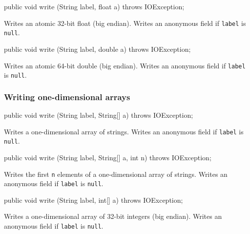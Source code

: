 \begin{code}

   public void write (String label, float a) throws IOException;
\end{code}
\begin{tabb}
Writes an atomic 32-bit float (big endian).
Writes an anonymous field if \texttt{label} is \texttt{null}.
\end{tabb}

\begin{code}

   public void write (String label, double a) throws IOException;
\end{code}
\begin{tabb}
Writes an atomic 64-bit double (big endian).
Writes an anonymous field if \texttt{label} is \texttt{null}.
\end{tabb}


\subsubsection*{Writing one-dimensional arrays}

\begin{code}

   public void write (String label, String[] a) throws IOException;
\end{code}
\begin{tabb}
Writes a one-dimensional array of strings.
Writes an anonymous field if \texttt{label} is \texttt{null}.
\end{tabb}

\begin{code}

   public void write (String label, String[] a, int n) throws IOException;
\end{code}
\begin{tabb}
Writes the first \texttt{n} elements of a one-dimensional array of strings.
Writes an anonymous field if \texttt{label} is \texttt{null}.
\end{tabb}

\begin{code}

   public void write (String label, int[] a) throws IOException;
\end{code}
\begin{tabb}
Writes a one-dimensional array of 32-bit integers (big endian).
Writes an anonymous field if \texttt{label} is \texttt{null}.
\end{tabb}

